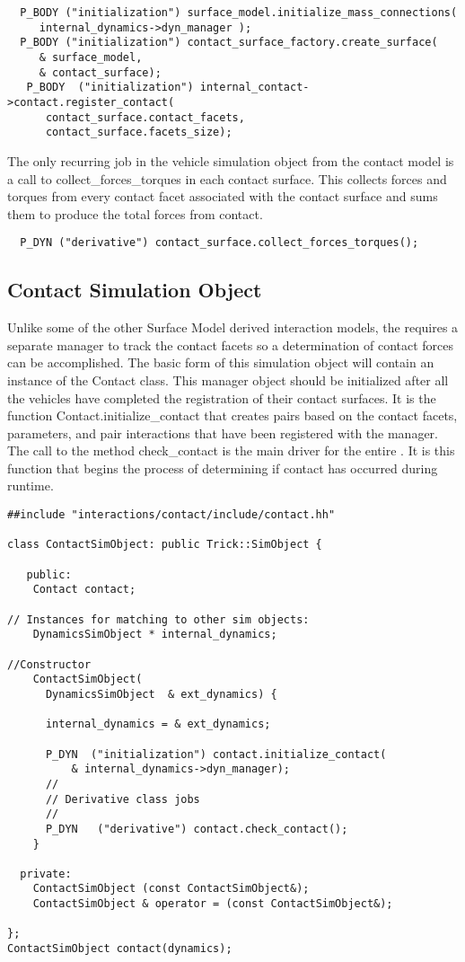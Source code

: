 \begin{verbatim}
  P_BODY ("initialization") surface_model.initialize_mass_connections(
     internal_dynamics->dyn_manager );
  P_BODY ("initialization") contact_surface_factory.create_surface(
     & surface_model,
     & contact_surface);
   P_BODY  ("initialization") internal_contact->contact.register_contact(
      contact_surface.contact_facets,
      contact_surface.facets_size);
\end{verbatim}
The only recurring job in the vehicle simulation object from the contact model is a call to collect\_forces\_torques in each contact surface.  This collects forces and torques from every contact facet associated with the contact surface and sums them to produce the total forces from contact.
\begin{verbatim}
  P_DYN ("derivative") contact_surface.collect_forces_torques();
\end{verbatim}

\subsection{Contact Simulation Object}
Unlike some of the other Surface Model derived interaction models, the \ModelDesc requires a separate manager to track the contact facets so a determination of contact forces can be accomplished.  The basic form of this simulation object will contain an instance of the Contact class.  This manager object should be initialized after all the vehicles have completed the registration of their contact surfaces.  It is the function Contact.initialize\_contact that creates pairs based on the contact facets, parameters, and pair interactions that have been registered with the manager.
The call to the method check\_contact is the main driver for the entire \ModelDesc.  It is this function that begins the process of determining if contact has occurred during runtime.

\begin{verbatim}
##include "interactions/contact/include/contact.hh"

class ContactSimObject: public Trick::SimObject {

   public:
    Contact contact;

// Instances for matching to other sim objects:
    DynamicsSimObject * internal_dynamics;

//Constructor
    ContactSimObject(
      DynamicsSimObject  & ext_dynamics) {

      internal_dynamics = & ext_dynamics;

      P_DYN  ("initialization") contact.initialize_contact(
          & internal_dynamics->dyn_manager);
      //
      // Derivative class jobs
      //
      P_DYN   ("derivative") contact.check_contact();
    }

  private:
    ContactSimObject (const ContactSimObject&);
    ContactSimObject & operator = (const ContactSimObject&);

};
ContactSimObject contact(dynamics);
\end{verbatim}

